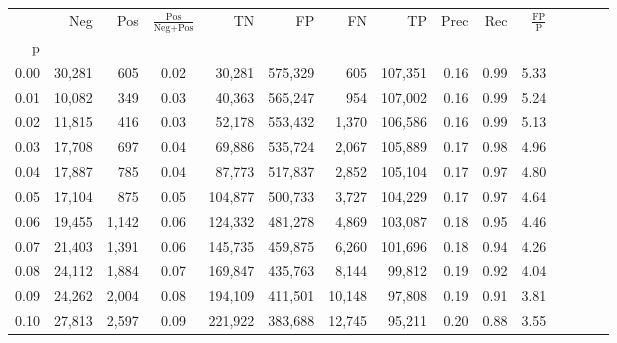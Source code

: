\begin{tabular}{rrrcrrrrrrrrrrr}
\toprule
{} &     Neg &    Pos & $\frac{\text{Pos}}{\text{Neg}+\text{Pos}}$ &       TN &       FP &       FN &       TP &  Prec &   Rec & $\frac{\text{FP}}{\text{P}}$ \\
p    &         &        &                                            &          &          &          &          &       &       &                              \\
\midrule
0.00 &  30,281 &    605 &                                       0.02 &   30,281 &  575,329 &      605 &  107,351 &  0.16 &  0.99 &                         5.33 \\
0.01 &  10,082 &    349 &                                       0.03 &   40,363 &  565,247 &      954 &  107,002 &  0.16 &  0.99 &                         5.24 \\
0.02 &  11,815 &    416 &                                       0.03 &   52,178 &  553,432 &    1,370 &  106,586 &  0.16 &  0.99 &                         5.13 \\
0.03 &  17,708 &    697 &                                       0.04 &   69,886 &  535,724 &    2,067 &  105,889 &  0.17 &  0.98 &                         4.96 \\
0.04 &  17,887 &    785 &                                       0.04 &   87,773 &  517,837 &    2,852 &  105,104 &  0.17 &  0.97 &                         4.80 \\
0.05 &  17,104 &    875 &                                       0.05 &  104,877 &  500,733 &    3,727 &  104,229 &  0.17 &  0.97 &                         4.64 \\
0.06 &  19,455 &  1,142 &                                       0.06 &  124,332 &  481,278 &    4,869 &  103,087 &  0.18 &  0.95 &                         4.46 \\
0.07 &  21,403 &  1,391 &                                       0.06 &  145,735 &  459,875 &    6,260 &  101,696 &  0.18 &  0.94 &                         4.26 \\
0.08 &  24,112 &  1,884 &                                       0.07 &  169,847 &  435,763 &    8,144 &   99,812 &  0.19 &  0.92 &                         4.04 \\
0.09 &  24,262 &  2,004 &                                       0.08 &  194,109 &  411,501 &   10,148 &   97,808 &  0.19 &  0.91 &                         3.81 \\
0.10 &  27,813 &  2,597 &                                       0.09 &  221,922 &  383,688 &   12,745 &   95,211 &  0.20 &  0.88 &                         3.55 \\

\end{tabular}

